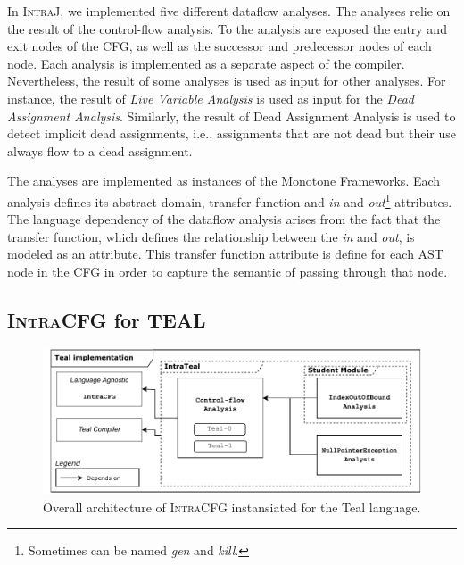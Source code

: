 In \textsc{IntraJ}, we implemented five different dataflow analyses. The analyses 
relie on the result of the control-flow analysis. To the analysis are exposed 
the entry and exit nodes of the CFG, as well as the successor and predecessor
nodes of each node. 
Each analysis is implemented as a separate aspect of the compiler. Nevertheless,
the result of some analyses is used as input for other analyses. For instance,
the result of \emph{Live Variable Analysis} is used as input for the \emph{Dead Assignment Analysis}.
Similarly, the result of Dead Assignment Analysis is used to detect implicit dead assignments, i.e.,
assignments that are not dead but their use always flow to a dead assignment.

The analyses are implemented as instances of the Monotone Frameworks.
Each analysis defines its abstract domain, transfer function and \emph{in} and 
\emph{out}\footnote{Sometimes can be named \emph{gen} and \emph{kill}.} attributes.
The language dependency of the dataflow analysis arises from the fact that the
transfer function, which defines the relationship between the \emph{in} and \emph{out},
is modeled as an attribute. This transfer function attribute is 
define for each AST node in the CFG in order to capture the semantic of passing 
through that node.


















\subsection{\textsc{IntraCFG} for TEAL}
\begin{figure}[H]
	\centering
	\includegraphics[scale=0.65]{kappa/img/architectureteal.pdf}
	\caption{\label{fig:IntraTeal} Overall architecture of \textsc{IntraCFG} instansiated for the Teal language.}
\end{figure}
